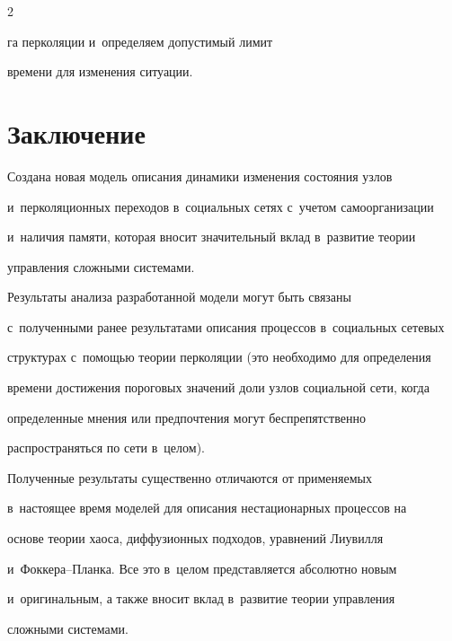 \begin{multicols}{2}
\begin{enumerate}
га перколяции и~определяем допустимый лимит 


времени для изменения ситуации.


\end{enumerate}





\vspace*{-6pt}





\section{Заключение}





  Создана новая модель описания динамики изменения состояния узлов 


и~перколяционных переходов в~социальных сетях с~учетом самоорганизации 


и~наличия памяти, которая вносит \mbox{значительный} вклад в~развитие тео\-рии 


управления сложными системами.


  


  Результаты анализа разработанной модели могут быть связаны 


с~полученными ранее результатами описания процессов в~социальных сетевых 


структурах с~помощью теории перколяции (это необходимо для определения 


времени достижения пороговых значений доли узлов социальной сети, когда 


определенные мнения или предпочтения могут беспрепятственно 


распространяться по сети в~целом).


  


  Полученные результаты существенно отличаются от применяемых 


в~настоящее время моделей для описания нестационарных процессов на 


основе тео\-рии хаоса, диффузионных подходов, уравнений Лиувилля  


и~Фок\-ке\-ра--План\-ка. Все это в~целом представляется абсолютно новым 


и~оригинальным, а также вносит вклад в~развитие теории управления 


сложными системами.



\end{multicols}
